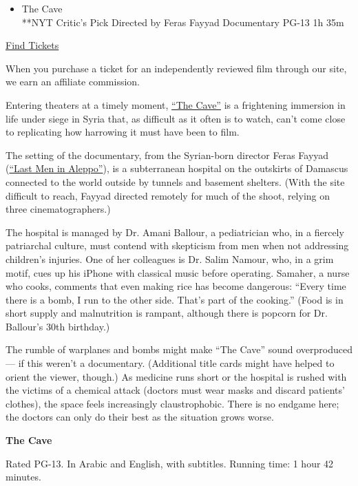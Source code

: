 \begin{itemize}
\tightlist
\item
  The Cave\\
  **NYT Critic's Pick Directed by Feras Fayyad Documentary PG-13 1h 35m
\end{itemize}

\href{https://www.imdb.com/showtimes/title/tt7178226?ref_=ref_ext_NYT}{Find
Tickets}

When you purchase a ticket for an independently reviewed film through
our site, we earn an affiliate commission.

Entering theaters at a timely moment,
\href{https://www.youtube.com/watch?v=TaZkwBWuN2A}{``The Cave''} is a
frightening immersion in life under siege in Syria that, as difficult as
it often is to watch, can't come close to replicating how harrowing it
must have been to film.

The setting of the documentary, from the Syrian-born director Feras
Fayyad
(\href{https://www.nytimes.com/2017/05/02/movies/last-men-in-aleppo-review.html}{``Last
Men in Aleppo''}), is a subterranean hospital on the outskirts of
Damascus connected to the world outside by tunnels and basement
shelters. (With the site difficult to reach, Fayyad directed remotely
for much of the shoot, relying on three cinematographers.)

The hospital is managed by Dr. Amani Ballour, a pediatrician who, in a
fiercely patriarchal culture, must contend with skepticism from men when
not addressing children's injuries. One of her colleagues is Dr. Salim
Namour, who, in a grim motif, cues up his iPhone with classical music
before operating. Samaher, a nurse who cooks, comments that even making
rice has become dangerous: ``Every time there is a bomb, I run to the
other side. That's part of the cooking.'' (Food is in short supply and
malnutrition is rampant, although there is popcorn for Dr. Ballour's
30th birthday.)

The rumble of warplanes and bombs might make ``The Cave'' sound
overproduced --- if this weren't a documentary. (Additional title cards
might have helped to orient the viewer, though.) As medicine runs short
or the hospital is rushed with the victims of a chemical attack (doctors
must wear masks and discard patients' clothes), the space feels
increasingly claustrophobic. There is no endgame here; the doctors can
only do their best as the situation grows worse.

\textbf{The Cave}

Rated PG-13. In Arabic and English, with subtitles. Running time: 1 hour
42 minutes.

